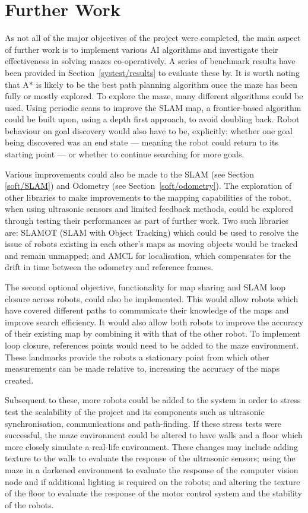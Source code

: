 
\chapter{Further Work}\label{furtherwork}
As not all of the major objectives of the project were completed, the main 
aspect of further work is to implement various AI algorithms and investigate 
their effectiveness in solving mazes co-operatively.  A series of benchmark 
results have been provided in Section~\ref{systest/results} to evaluate 
these by. It is worth noting that A* is likely to be the best path planning 
algorithm once the maze has been fully or mostly explored. To 
explore the maze, many different algorithms could be used. Using periodic scans
to improve the SLAM map, a frontier-based algorithm could be built upon, using a 
depth first approach, to avoid doubling back. 
Robot behaviour on goal discovery would also have to be, explicitly: whether 
one goal being discovered was an end state --- meaning the robot could return 
to its starting point --- or whether to continue searching for more goals.
  
Various improvements could also be made to the SLAM (see Section~
\ref{soft/SLAM}) and Odometry (see Section~\ref{soft/odometry}).  
The exploration of other libraries to make improvements to the mapping 
capabilities of the robot, when using ultrasonic sensors and limited feedback 
methods, could be explored through testing their performances as part of
further work. Two such libraries are: SLAMOT (SLAM with Object Tracking) which 
could be used to resolve the issue of robots existing in each other's maps as 
moving objects would be tracked and remain unmapped; and AMCL for
localisation, which compensates for the drift in time between the odometry and 
reference frames.   

The second optional objective, functionality for map sharing and SLAM loop 
closure across robots, could also be implemented. This would allow robots which 
have covered different paths to communicate their knowledge of the maps and 
improve search efficiency. It would also allow both robots to improve the 
accuracy of their existing map by combining it with that of the other robot.
To implement loop closure, references points would need to be added
to the maze environment. These landmarks provide the robots a stationary point 
from which other measurements can be made relative to, increasing the accuracy 
of the maps created.

Subsequent to these, more robots could be added to the system in order to 
stress test the scalability of the 
project and its components such as ultrasonic synchronisation, 
communications and path-finding. If these stress tests were successful, 
the maze environment could be altered to have walls and a floor which more 
closely simulate a real-life environment. These changes may include adding 
texture to the walls to evaluate the response of the ultrasonic sensors; 
using the maze in a darkened environment to evaluate the response of the 
computer vision node and if additional lighting is required on the robots; 
and altering the texture of the floor to evaluate the response of the motor 
control system and the stability of the robots. 


